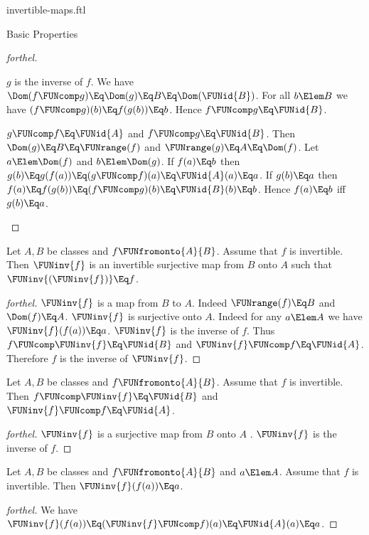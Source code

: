 \documentclass{stex}
\begin{document}
\begin{smodule}{invertible-maps.ftl}
\begin{sfragment}{Basic Properties}
\begin{proof}[forthel]
\begin{case}{$g$ is the inverse of $f$.}
      We have
      $\Dom(f \FUNcomp g)
        \Eq \Dom(g)
        \Eq B
        \Eq \Dom(\FUNid{B})$.
      For all $b \Elem B$ we have
      $(f \FUNcomp g)(b)
        \Eq f(g(b))
        \Eq b$.
      Hence $f \FUNcomp g \Eq \FUNid{B}$.
    \end{case}

    \begin{case}{$g \FUNcomp f \Eq \FUNid{A}$ and $f \FUNcomp g \Eq \FUNid{B}$.}
      Then $\Dom(g)
        \Eq B
        \Eq \FUNrange(f)$
      and $\FUNrange(g)
        \Eq A
        \Eq \Dom(f)$.
      Let $a \Elem \Dom(f)$ and $b \Elem \Dom(g)$.
      If $f(a) \Eq b$ then
      $g(b)
        \Eq g(f(a))
        \Eq (g \FUNcomp f)(a)
        \Eq \FUNid{A}(a)
        \Eq a$.
      If $g(b) \Eq a$ then
      $f(a)
        \Eq f(g(b))
        \Eq (f \FUNcomp g)(b)
        \Eq \FUNid{B}(b)
        \Eq b$.
      Hence $f(a) \Eq b$ iff $g(b) \Eq a$.
    \end{case}
  \end{proof}

  \begin{proposition}[forthel]
    Let $A, B$ be classes and $f \FUNfromonto{A}{B}$.
    Assume that $f$ is invertible.
    Then $\FUNinv{f}$ is an invertible surjective map from $B$ onto $A$ such that $\FUNinv{(\FUNinv{f})} \Eq f$.
  \end{proposition}
  \begin{proof}[forthel]
    $\FUNinv{f}$ is a map from $B$ to $A$.
    Indeed $\FUNrange(f) \Eq B$ and $\Dom(f) \Eq A$.
    $\FUNinv{f}$ is surjective onto $A$.
    Indeed for any $a \Elem A$ we have $\FUNinv{f}(f(a)) \Eq a$.
    $\FUNinv{f}$ is the inverse of $f$.
    Thus $f \FUNcomp \FUNinv{f} \Eq \FUNid{B}$ and $\FUNinv{f} \FUNcomp f \Eq \FUNid{A}$.
    Therefore $f$ is the inverse of $\FUNinv{f}$.
  \end{proof}

  \begin{proposition}[forthel]
    Let $A, B$ be classes and $f \FUNfromonto{A}{B}$.
    Assume that $f$ is invertible.
    Then $f \FUNcomp \FUNinv{f} \Eq \FUNid{B}$ and $\FUNinv{f} \FUNcomp f \Eq \FUNid{A}$.
  \end{proposition}
  \begin{proof}[forthel]
    $\FUNinv{f}$ is a surjective map from $B$ onto $A$ .
    $\FUNinv{f}$ is the inverse of $f$.
  \end{proof}

  \begin{proposition}[forthel]
    Let $A, B$ be classes and $f \FUNfromonto{A}{B}$ and $a \Elem A$.
    Assume that $f$ is invertible.
    Then $\FUNinv{f}(f(a)) \Eq a$.
  \end{proposition}
  \begin{proof}[forthel]
    We have $\FUNinv{f}(f(a)) \Eq (\FUNinv{f} \FUNcomp f)(a) \Eq \FUNid{A}(a) \Eq a$.
  \end{proof}


\end{sfragment}
\end{smodule}
\end{document}
